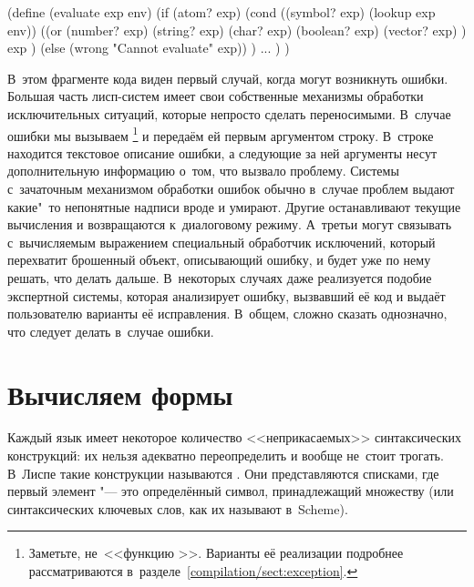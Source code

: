 
\begin{code:lisp}
(define (evaluate exp env)
  (if (atom? exp)
      (cond ((symbol? exp) (lookup exp env))
            ((or (number? exp) (string? exp) (char? exp)
                 (boolean? exp) (vector? exp) )
             exp )
            (else (wrong "Cannot evaluate" exp)) )
      ... ) )
\end{code:lisp}


В~этом фрагменте кода виден первый случай, когда могут возникнуть ошибки.
Большая часть лисп-систем имеет свои собственные механизмы обработки
исключительных ситуаций, которые непросто сделать переносимыми. В~случае ошибки
мы вызываем \footnote{Заметьте, не~<<функцию >>. Варианты её
реализации подробнее рассматриваются в~разделе~\ref{compilation/sect:exception}.}
и передаём ей первым аргументом строку. В~строке находится текстовое описание
ошибки, а следующие за ней аргументы несут дополнительную информацию о~том, что
вызвало проблему. Системы с~зачаточным механизмом обработки ошибок обычно
в~случае проблем выдают какие"~то непонятные надписи вроде  и умирают. Другие останавливают текущие вычисления и возвращаются
к~диалоговому режиму. А~третьи могут связывать с~вычисляемым выражением
специальный обработчик исключений, который перехватит брошенный объект,
описывающий ошибку, и будет уже по нему решать, что делать дальше.
 В~некоторых случаях даже реализуется
подобие экспертной системы, которая анализирует ошибку, вызвавший её код и
выдаёт пользователю варианты её исправления. В~общем, сложно сказать однозначно,
что следует делать в~случае ошибки.


\section{Вычисляем формы}

Каждый язык имеет некоторое количество <<неприкасаемых>> синтаксических
конструкций: их нельзя адекватно переопределить и вообще не~стоит трогать.
В~Лиспе такие конструкции называются . Они
представляются списками, где первый элемент "--- это определённый символ,
принадлежащий множеству  (или синтаксических
ключевых слов, как их называют в~Scheme).

